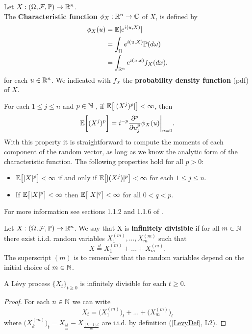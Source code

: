 \begin{Definition} \label{chf}
Let $X:(\Omega,\mathcal{F}, \mathbb{P}) \to \mathbb{R}^n$.\\ 
The \textbf{Characteristic function} $\phi_X:\mathbb{R}^n \to \mathbb{C}$  of $X$, is defined by
\begin{align}
\phi_{X}(u) &= \mathbb{E} [e^{i(u,X)}] \nonumber \\
            &= \int_{\Omega} e^{i(u,X)} \mathbb{P}(d\omega) \nonumber \\
            &= \int_{\mathbb{R}^n} e^{i(u,x)} f_X(dx).
\end{align}
for each $u \in \mathbb{R}^n$. We indicated with $f_X$ the \textbf{probability density function} (pdf) of $X$.
\end{Definition}
For each $1 \leq j \leq n$ and $p \in \mathbb{N}$ , if $\mathbb{E}\bigl[ |(X^j)^{p}| \bigr] < \infty$, then 
\begin{equation}\label{moments}
 \mathbb{E}\biggl[ (X^j)^{p} \biggr] = i^{-p}\frac{\partial^p}{\partial u_j^{p}} \phi_X(u) \biggr|_{u=0} .
\end{equation}
With this property it is straightforward to compute the moments of each component of the random vector, as long as we know the analytic form 
of the characteristic function.
The following properties hold for all $p>0$:
\begin{itemize}
 \item $\mathbb{E} \bigl[ |X|^p \bigr] < \infty $ if and only if $\mathbb{E} \bigl[ |(X^j)|^p \bigr] < \infty $ for each $1 \leq j \leq n$. 
 \item If $\mathbb{E} \bigl[ |X|^p \bigr] < \infty $ then $\mathbb{E} \bigl[ |X|^q \bigr] < \infty $ for all $0 < q < p$.
\end{itemize}
For more information see sections 1.1.2 and 1.1.6 of \cite{Applebaum}.
\begin{Definition}\label{inf_div}
 Let $X:(\Omega,\mathcal{F}, \mathbb{P}) \to \mathbb{R}^n$.
 We say that X is \textbf{infinitely divisible} if for all $m \in \mathbb{N}$ there exist i.i.d. random variables $X_1^{(m)},...,X_m^{(m)}$
 such that
 \begin{equation}
  X \overset{d}{=} X_1^{(m)} + ... + X_m^{(m)}.
 \end{equation}
 The superscript $(m)$ is to remember that the random variables depend on the initial choice of $m\in \mathbb{N}$.
\end{Definition}

\begin{Theorem}
 A Lévy process $\{X_t\}_{t \ge 0}$ is infinitely divisible for each $t\geq0$. 
\end{Theorem}
\begin{proof}
 For each $n \in \mathbb{N}$ we can write 
 $$ X_t = \bigl( X_1^{(m)} \bigr)_t + ... + \bigl( X_m^{(m)} \bigr)_t $$
 where $ \bigl( X_k^{(m)} \bigr)_t = X_{\frac{kt}{m}} - X_{\frac{(k-1)t}{m}} $ are i.i.d. by definition (\ref{LevyDef}, L2).
\end{proof}

